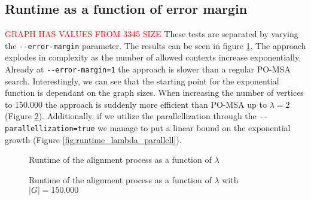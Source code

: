\documentclass[thesis.tex]{subfiles}
\begin{document}
\subsection*{Runtime as a function of error margin}
\textcolor{red}{GRAPH HAS VALUES FROM 3345 SIZE}
These tests are separated by varying the \texttt{-{}-error-margin} parameter. The results can be seen in figure \ref{fig:runtime_lambda}. The approach explodes in complexity as the number of allowed contexts increase exponentially. Already at \texttt{-{}-error-margin=1} the approach is slower than a regular PO-MSA search. Interestingly, we can see that the starting point for the exponential function is dependant on the graph sizes. When increasing the number of vertices to $150.000$ the approach is suddenly more efficient than PO-MSA up to $\lambda=2$ (Figure \ref{fig:runtime_lambda_large}). Additionally, if we utilize the parallellization through the \texttt{-{}-parallellization=true} we manage to put a linear bound on the exponential growth (Figure \ref{fig:runtime_lambda_parallell}).
\begin{figure}
  \caption{Runtime of the alignment process as a function of $\lambda$}
  \label{fig:runtime_lambda}
\end{figure}
\begin{figure}
  \caption{Runtime of the alignment process as a function of $\lambda$ with $|G|=150.000$}
  \label{fig:runtime_lambda_large}
\end{figure}
\end{document}
